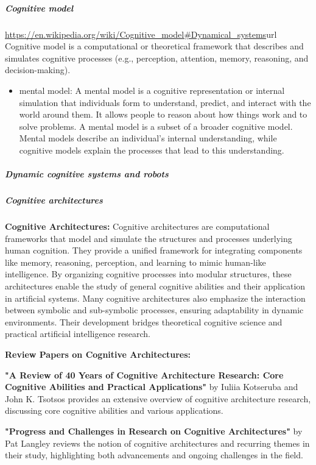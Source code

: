 \documentclass{book}
\providecommand{\ProjectDeepHeading}[2]{%
    \par\medskip\noindent\textbf{#2}\par\smallskip
}
\begin{document}
    \subparagraph{Cognitive model} \url{https://en.wikipedia.org/wiki/Cognitive_model\#Dynamical_systems}{url}
        Cognitive model is a computational or theoretical framework that describes and simulates cognitive processes (e.g., perception, attention, memory, reasoning, and decision-making).
        \begin{itemize}
            \item mental model: A mental model is a cognitive representation or internal simulation that individuals form to understand, predict, and interact with the world around them. It allows people to reason about how things work and to solve problems. A mental model is a subset of a broader cognitive model. Mental models describe an individual's internal understanding, while cognitive models explain the processes that lead to this understanding.
        \end{itemize}
    \subparagraph{Dynamic cognitive systems and robots}

    \subparagraph{Cognitive architectures}
        \textbf{Cognitive Architectures:} Cognitive architectures are computational frameworks that model and simulate the structures and processes underlying human cognition. They provide a unified framework for integrating components like memory, reasoning, perception, and learning to mimic human-like intelligence. By organizing cognitive processes into modular structures, these architectures enable the study of general cognitive abilities and their application in artificial systems. Many cognitive architectures also emphasize the interaction between symbolic and sub-symbolic processes, ensuring adaptability in dynamic environments. Their development bridges theoretical cognitive science and practical artificial intelligence research. 

        \ProjectDeepHeading{1}{Review Papers on Cognitive Architectures:}

            \textbf{"A Review of 40 Years of Cognitive Architecture Research: Core Cognitive Abilities and Practical Applications"} by Iuliia Kotseruba and John K. Tsotsos provides an extensive overview of cognitive architecture research, discussing core cognitive abilities and various applications. 

            \textbf{"Progress and Challenges in Research on Cognitive Architectures"} by Pat Langley reviews the notion of cognitive architectures and recurring themes in their study, highlighting both advancements and ongoing challenges in the field. 
\end{document}
